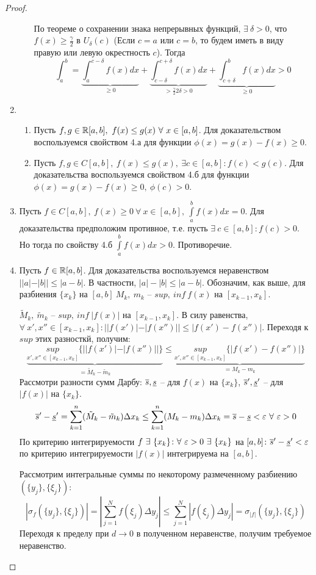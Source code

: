 \begin{proof}
\begin{enumerate}
\begin{enumerate}
По теореме о сохранении знака непрерывных функций, $\exists\ \delta>0$, что $f(x)\geq\frac\gamma2$ в $U_\delta(c)$ (Если $c=a$ или $c=b$, то будем иметь в виду правую или левую окрестность $c$). Тогда
$$
\int_a^b=\underset{\geq0}{\underbrace{\int_a^{c-\delta}f(x)dx}}+\underset{>\frac\gamma22\delta>0}{\underbrace{\int_{c-\delta}^{c+\delta}f(x)dx}}+\underset{\geq0}{\underbrace{\int^b_{c+\delta}f(x)dx}}>0
$$
\end{enumerate}
\item
\begin{enumerate}
\item Пусть $f,g\in\R[a,b],\ f(x)\leq g(x)\ \forall\ x\in[a,b]$. Для доказательством воспользуемся свойством 4.а для функции $\phi(x)=g(x)-f(x)\geq0$.
\item Пусть $f,g\in C[a,b],\ f(x)\leq g(x),\ \exists c\in[a,b]\colon f(c)<g(c)$. Для доказательства воспользуемся свойством 4.б для функции $\phi(x)=g(x)-f(x)\geq0,\ \phi(c)>0$.
\end{enumerate}
\item Пусть $f\in C[a,b],\ f(x)\geq0\ \forall\ x\in[a,b],\ \int\limits^b_af(x)dx=0$. Для доказательства предположим противное, т.е. пусть $\exists\ c\in[a,b]\colon f(c)>0$. Но тогда по свойству 4.б $\int\limits^b_af(x)dx>0$. Противоречие.
\item Пусть $f\in\mathbb{R}[a,b]$. Для доказательства воспользуемся неравенством $||a|-|b||\leq|a-b|$. В частности, $|a|-|b|\leq|a-b|$. Обозначим, как выше, для разбиения $\{x_k\}$ на $[a,b]\ M_k,\ m_k$ -- $sup,\ inf\ f(x)$ на $[x_{k-1},x_k]$.

$\tilde{M}_k,\ \tilde{m}_k$ -- $sup,\ inf\ |f(x)|$ на $[x_{k-1},x_k]$. В силу равенства, $\forall\ x',x''\in[x_{k-1},x_k]\colon||f(x')|-|f(x'')||\leq|f(x')-f(x'')|$. Переходя к $sup$ этих разносткй, получим:
$$
\underset{=\tilde{M}_k-\tilde{m}_k}{\underbrace{\underset{x',x''\in[x_{k-1},x_k]}{sup}\{||f(x')|-|f(x'')||\}}}\leq \underset{=M_k-m_k}{\underbrace{\underset{x',x''\in[x_{k-1},x_k]}{sup}\{|f(x')-f(x'')|\}}}
$$
Рассмотри разности сумм Дарбу: $\overline{s},\underline{s}$ -- для $f(x)$ на $\{x_k\}$, $\overline{s}',\underline{s}'$ -- для $|f(x)|$ на $\{x_k\}$.
$$
\vs'-\ns'=\sum^n_{k=1}(\tilde{M}_k-\tilde{m}_k)\Delta x_k\leq\sum^n_{k=1}(M_k-m_k)\Delta x_k=\vs-\ns<\eps\ \forall\ \eps>0
$$
По критерию интегрируемости $f\ \exists\ \{x_k\}\colon\forall\ \eps>0\ \exists\ \{x_k\}$ на $[a,b]\colon\overline{s}'-\underline{s}'<\varepsilon$ \then по критерию интегрируемости $|f(x)|$ интегрируема на $[a,b]$.

Рассмотрим интегральные суммы по некоторому размеченному разбиению $(\{y_j\},\{\xi_j\})$:
$$
|\sigma_f(\{y_j\},\{\xi_j\})|=|\sum^N_{j=1}f(\xi_j)\Delta y_j|\leq\sum^N_{j=1}|f(\xi_j)\Delta y_j|=\sigma_{|f|}(\{y_j\},\{\xi_j\})
$$
Переходя к пределу при $d\to0$ в полученном неравенстве, получим требуемое неравенство.
\end{enumerate}
\end{proof}
